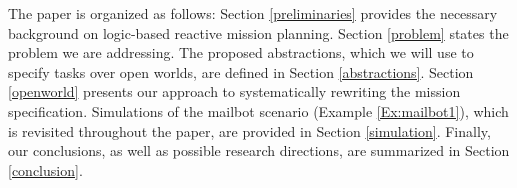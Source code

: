 The paper is organized as follows: Section \ref{preliminaries} provides the necessary background on logic-based reactive mission planning. Section \ref{problem} states the problem we are addressing. The proposed abstractions, which we will use to specify tasks over open worlds, are defined in Section \ref{abstractions}. Section \ref{openworld} presents our approach to systematically rewriting the mission specification. Simulations of the mailbot scenario (Example \ref{Ex:mailbot1}), which is revisited throughout the paper, are provided in Section \ref{simulation}. Finally, our conclusions, as well as possible research directions, are summarized in Section \ref{conclusion}.

